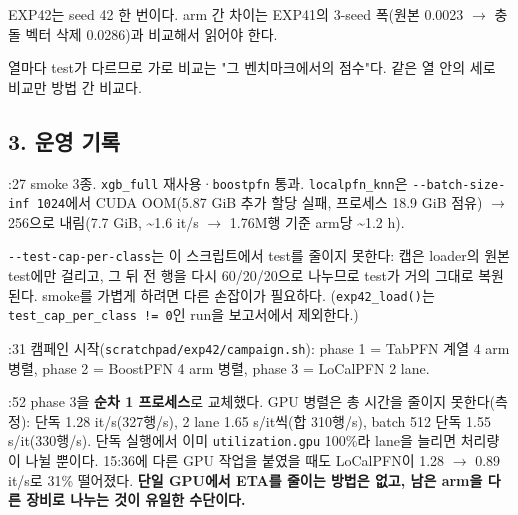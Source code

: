 \par\noindent \textbullet\enspace EXP42는 seed 42 한 번이다. arm 간 차이는 EXP41의 3-seed 폭(원본 0.0023  \ensuremath{\rightarrow}  충돌 벡터 삭제 0.0286)과 비교해서 읽어야 한다.


\par\noindent \textbullet\enspace 열마다 test가 다르므로 가로 비교는 "그 벤치마크에서의 점수"다. 같은 열 안의 세로 비교만 방법 간 비교다.


\subsection{3. 운영 기록}
\par\noindent \textbullet{}:27 smoke 3종. \texttt{xgb\_\allowbreak{}\allowbreak{}full\allowbreak{}} 재사용·\texttt{boostpfn\allowbreak{}} 통과. \texttt{localpfn\allowbreak{}\_\allowbreak{}\allowbreak{}knn}은 \texttt{-\allowbreak{}-\allowbreak{}batch-\allowbreak{}size-\allowbreak{}inf\allowbreak{} 1024}에서 CUDA OOM(5.87 GiB 추가 할당 실패, 프로세스 18.9 GiB 점유)  \ensuremath{\rightarrow}  256으로 내림(7.7 GiB, \textasciitilde{}1.6 it/\allowbreak{}s  \ensuremath{\rightarrow}  1.76M행 기준 arm당 \textasciitilde{}1.2 h).


\par\noindent \textbullet\enspace \texttt{-\allowbreak{}-\allowbreak{}test-\allowbreak{}c\allowbreak{}ap-\allowbreak{}per-\allowbreak{}c\allowbreak{}lass}는 이 스크립트에서 test를 줄이지 못한다: 캡은 loader의 원본 test에만 걸리고, 그 뒤 전 행을 다시 60/\allowbreak{}20/\allowbreak{}20으로 나누므로 test가 거의 그대로 복원된다. smoke를 가볍게 하려면 다른 손잡이가 필요하다. (\texttt{exp42\_\allowbreak{}\allowbreak{}lo\allowbreak{}ad()}는 \texttt{test\_\allowbreak{}\allowbreak{}cap\allowbreak{}\_\allowbreak{}\allowbreak{}per\_\allowbreak{}\allowbreak{}cla\allowbreak{}ss !=\allowbreak{}\allowbreak{} 0}인 run을 보고서에서 제외한다.)


\par\noindent \textbullet{}:31 캠페인 시작(\texttt{scratchp\allowbreak{}ad/\allowbreak{}\allowbreak{}exp42\allowbreak{}/\allowbreak{}\allowbreak{}campaig\allowbreak{}n.\allowbreak{}sh}): phase 1 =\allowbreak{} TabPFN 계열 4 arm 병렬, phase 2 =\allowbreak{} BoostPFN 4 arm 병렬, phase 3 =\allowbreak{} LoCalPFN 2 lane.


\par\noindent \textbullet{}:52 phase 3을 \textbf{순차 1 프로세스}로 교체했다. GPU 병렬은 총 시간을 줄이지 못한다(측정): 단독 1.28 it/\allowbreak{}s(327행/\allowbreak{}s), 2 lane 1.65 s/\allowbreak{}it씩(합 310행/\allowbreak{}s), batch 512 단독 1.55 s/\allowbreak{}it(330행/\allowbreak{}s). 단독 실행에서 이미 \texttt{utilizat\allowbreak{}ion.\allowbreak{}gpu} 100\%라 lane을 늘리면 처리량이 나뉠 뿐이다. 15:36에 다른 GPU 작업을 붙였을 때도 LoCalPFN이 1.28  \ensuremath{\rightarrow}  0.89 it/\allowbreak{}s로 31\% 떨어졌다. \textbf{단일 GPU에서 ETA를 줄이는 방법은 없고, 남은 arm을 다른 장비로 나누는 것이 유일한 수단이다.}


